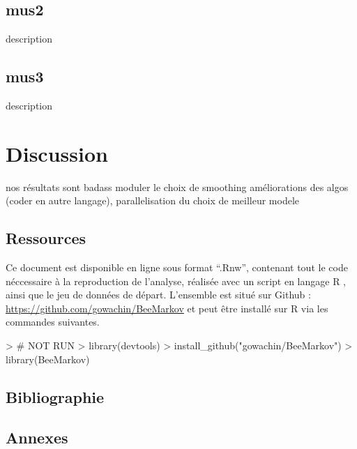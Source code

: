 \documentclass[10pt,a4paper,notitlepage,colorinlistoftodos]{article}
\begin{document}
\begin{multicols}{2}
\subsection*{mus2}
description
\subsection*{mus3}
description

\section*{Discussion}
nos résultats sont badass
moduler le choix de smoothing
améliorations des algos (coder en autre langage), parallelisation du choix de meilleur modele

\subsection*{Ressources}

Ce document est disponible en ligne sous format ``.Rnw'', contenant tout le code néccessaire à la reproduction de l'analyse, réalisée avec un script en langage R \citep{RTeam2017}, ainsi que le jeu de données de départ. L'ensemble est situé sur Github : \url{https://github.com/gowachin/BeeMarkov} et peut être installé sur R via les commandes suivantes.

\begin{Schunk}
\begin{Sinput}
> # NOT RUN
> library(devtools)
> install_github("gowachin/BeeMarkov")
> library(BeeMarkov)
\end{Sinput}
\end{Schunk}

\subsection*{Bibliographie}



\end{multicols}

\newpage
\subsection*{Annexes}
\end{document}
